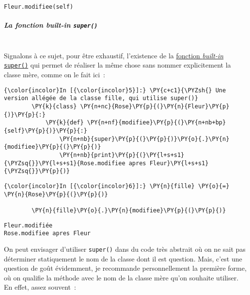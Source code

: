 \begin{verbatim}
Fleur.modifiee(self)
\end{verbatim}

    \hypertarget{la-fonction-built-in-super}{%
\subparagraph{\texorpdfstring{La fonction \emph{built-in}
\texttt{super()}\\\\}{La fonction built-in super()}}\label{la-fonction-built-in-super}}

    Signalons à ce sujet, pour être exhaustif, l'existence de la
\href{https://docs.python.org/3/library/functions.html\#super}{fonction
\emph{built-in} \texttt{super()}} qui permet de réaliser la même chose
sans nommer explicitement la classe mère, comme on le fait ici~:

    \begin{Verbatim}[commandchars=\\\{\}]
{\color{incolor}In [{\color{incolor}5}]:} \PY{c+c1}{\PYZsh{} Une version allégée de la classe fille, qui utilise super()}
        \PY{k}{class} \PY{n+nc}{Rose}\PY{p}{(}\PY{n}{Fleur}\PY{p}{)}\PY{p}{:}
            \PY{k}{def} \PY{n+nf}{modifiee}\PY{p}{(}\PY{n+nb+bp}{self}\PY{p}{)}\PY{p}{:}
                \PY{n+nb}{super}\PY{p}{(}\PY{p}{)}\PY{o}{.}\PY{n}{modifiee}\PY{p}{(}\PY{p}{)}
                \PY{n+nb}{print}\PY{p}{(}\PY{l+s+s1}{\PYZsq{}}\PY{l+s+s1}{Rose.modifiee apres Fleur}\PY{l+s+s1}{\PYZsq{}}\PY{p}{)}
\end{Verbatim}


    \begin{Verbatim}[commandchars=\\\{\}]
{\color{incolor}In [{\color{incolor}6}]:} \PY{n}{fille} \PY{o}{=} \PY{n}{Rose}\PY{p}{(}\PY{p}{)}
        
        \PY{n}{fille}\PY{o}{.}\PY{n}{modifiee}\PY{p}{(}\PY{p}{)}
\end{Verbatim}


    \begin{Verbatim}[commandchars=\\\{\}]
Fleur.modifiée
Rose.modifiee apres Fleur

    \end{Verbatim}

    On peut envisager d'utiliser \texttt{super()} dans du code très abstrait
où on ne sait pas déterminer statiquement le nom de la classe dont il
est question. Mais, c'est une question de goût évidemment, je recommande
personnellement la première forme, où on qualifie la méthode avec le nom
de la classe mère qu'on souhaite utiliser. En effet, assez souvent~:

